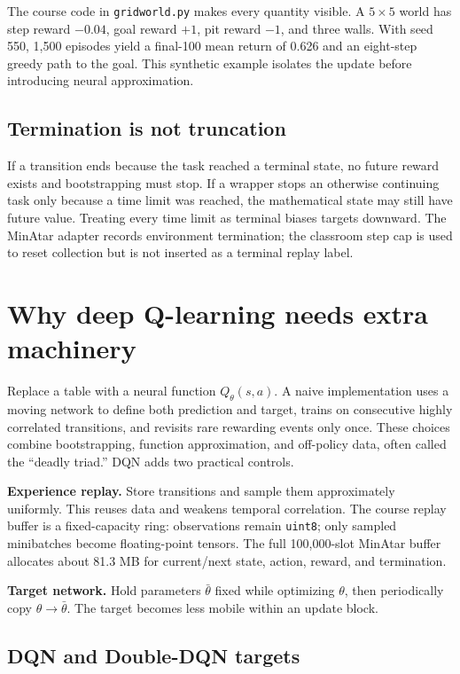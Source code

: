 \documentclass[11pt]{article}
\begin{document}
The course code in \texttt{gridworld.py} makes every quantity visible. A
$5\times5$ world has step reward $-0.04$, goal reward $+1$, pit reward $-1$,
and three walls. With seed 550, 1,500 episodes yield a final-100 mean return of
0.626 and an eight-step greedy path to the goal. This synthetic example isolates
the update before introducing neural approximation.

\subsection{Termination is not truncation}

If a transition ends because the task reached a terminal state, no future reward
exists and bootstrapping must stop. If a wrapper stops an otherwise continuing
task only because a time limit was reached, the mathematical state may still
have future value. Treating every time limit as terminal biases targets downward.
The MinAtar adapter records environment termination; the classroom step cap is
used to reset collection but is not inserted as a terminal replay label.

\section{Why deep Q-learning needs extra machinery}

Replace a table with a neural function $Q_\theta(s,a)$. A naive implementation
uses a moving network to define both prediction and target, trains on consecutive
highly correlated transitions, and revisits rare rewarding events only once.
These choices combine bootstrapping, function approximation, and off-policy data,
often called the ``deadly triad.'' DQN adds two practical controls.

\textbf{Experience replay.} Store transitions and sample them approximately
uniformly. This reuses data and weakens temporal correlation. The course replay
buffer is a fixed-capacity ring: observations remain \texttt{uint8}; only sampled
minibatches become floating-point tensors. The full 100,000-slot MinAtar buffer
allocates about 81.3 MB for current/next state, action, reward, and termination.

\textbf{Target network.} Hold parameters $\bar\theta$ fixed while optimizing
$\theta$, then periodically copy $\theta\to\bar\theta$. The target becomes less
mobile within an update block.

\subsection{DQN and Double-DQN targets}
\end{document}
